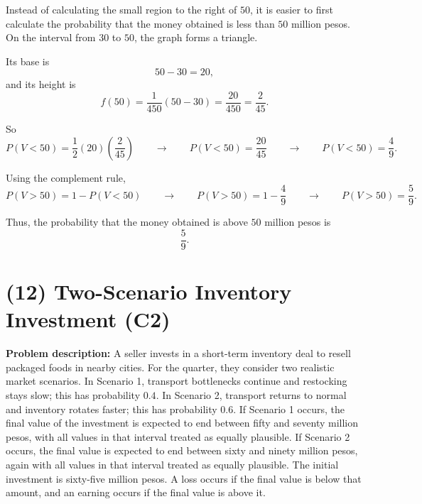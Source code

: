 	Instead of calculating the small region to the right of $50$, it is easier to first calculate the probability that the money obtained is less than $50$ million pesos. On the interval from $30$ to $50$, the graph forms a triangle.
	
	Its base is
	\[
	50-30=20,
	\]
	and its height is
	\[
	f(50)=\frac{1}{450}(50-30)=\frac{20}{450}=\frac{2}{45}.
	\]
	
	So
	\[
	P(V<50)=\frac12(20)\left(\frac{2}{45}\right)\qquad \longrightarrow \qquad P(V<50)=\frac{20}{45}\qquad \longrightarrow \qquad P(V<50)=\frac{4}{9}.
	\]
	
	Using the complement rule,
	\[
	P(V>50)=1-P(V<50)\qquad \longrightarrow \qquad P(V>50)=1-\frac{4}{9}\qquad \longrightarrow \qquad P(V>50)=\frac{5}{9}.
	\]
	
	Thus, the probability that the money obtained is above $50$ million pesos is
	\[
	\frac{5}{9}.
	\]
	
	
	\section{(12) Two-Scenario Inventory Investment (C2)}
	\label{sec:two-scenario-inventory-investment-c2}
	
	\textbf{Problem description:}
	A seller invests in a short-term inventory deal to resell packaged foods in nearby cities. For the quarter, they consider two realistic market scenarios. In Scenario 1, transport bottlenecks continue and restocking stays slow; this has probability $0.4$. In Scenario 2, transport returns to normal and inventory rotates faster; this has probability $0.6$. If Scenario 1 occurs, the final value of the investment is expected to end between fifty and seventy million pesos, with all values in that interval treated as equally plausible. If Scenario 2 occurs, the final value is expected to end between sixty and ninety million pesos, again with all values in that interval treated as equally plausible. The initial investment is sixty-five million pesos. A loss occurs if the final value is below that amount, and an earning occurs if the final value is above it.
	
